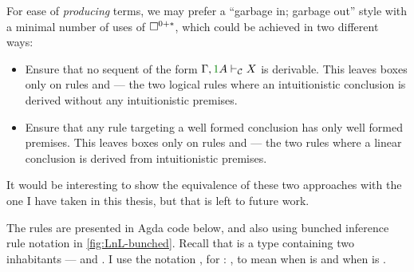 For ease of \emph{producing} terms, we may prefer a ``garbage in; garbage out''
style with a minimal number of uses of $\Box^{0{+}{*}}$, which could be achieved in two
different ways:
\begin{itemize}
  \item
    Ensure that no sequent of the form $\Gamma, \gr1A \vdashC X$ is derivable.
    This leaves boxes only on rules  and  --- the
    two logical rules where an intuitionistic conclusion is derived without any
    intuitionistic premises.
  \item
    Ensure that any rule targeting a well formed conclusion has only well formed
    premises.
    This leaves boxes only on rules  and  --- the
    two rules where a linear conclusion is derived from intuitionistic premises.
\end{itemize}
It would be interesting to show the equivalence of these two approaches with the
one I have taken in this thesis, but that is left to future work.

The rules are presented in Agda code below, and also using bunched inference
rule notation in \cref{fig:LnL-bunched}.
Recall that  is a type containing two inhabitants ---
 and .
I use the notation \AgdaFunction{[}  \AgdaFunction{>}
 \AgdaFunction{<}  \AgdaFunction{]}, for
 \AgdaSymbol: , to mean  when
 is  and  when
 is .

